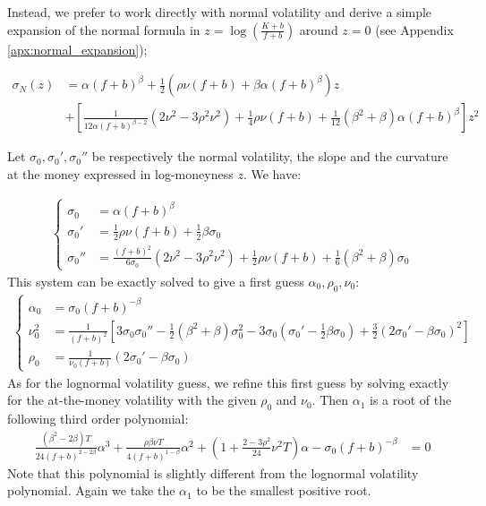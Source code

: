 \documentclass[]{rAMF2e}
\begin{document}
Instead, we prefer to work directly with normal volatility and derive a simple expansion of the normal formula in $z=\log\left(\frac{K+b}{f+b}\right)$ around $z=0$ (see Appendix \ref{apx:normal_expansion});

\begin{align}
\sigma_N(z) &= \alpha (f+b)^\beta + \frac{1}{2}\left(\rho \nu (f+b)+\beta \alpha (f+b)^\beta \right)z\nonumber\\
&+ \left[\frac{1}{12\alpha (f+b)^{\beta-2}}(2\nu^2-3\rho^2 \nu^2)+\frac{1}{4} \rho \nu (f+b)+\frac{1}{12}(\beta^2+\beta)\alpha (f+b)^\beta \right]z^2
\end{align}

Let $\sigma_0, \sigma_0', \sigma_0''$ be respectively the normal volatility, the slope and the curvature at the money expressed in log-moneyness $z$. We have:

\begin{align}
\begin{cases}
\sigma_0 &= \alpha (f+b)^{\beta}\\
\sigma_0' &= \frac{1}{2}\rho \nu (f+b) + \frac{1}{2} \beta \sigma_0\\
\sigma_0'' &= \frac{(f+b)^2}{6\sigma_0}(2\nu^2 - 3\rho^2\nu^2)+\frac{1}{2} \rho \nu (f+b)+\frac{1}{6}(\beta^2+\beta)\sigma_0
\end{cases}
\end{align}
This system can be exactly solved to give a first guess $\alpha_0, \rho_0,\nu_0$:
\begin{align}
  \begin{cases}
\alpha_0 &=  \sigma_0 (f+b)^{-\beta}\\
\nu_0^2 &= \frac{1}{(f+b)^2}\left[ 3\sigma_0\sigma_0''-\frac{1}{2}(\beta^2+\beta)\sigma_0^2-3\sigma_0(\sigma_0'-\frac{1}{2}\beta\sigma_0) +\frac{3}{2}\left(2\sigma_0'-\beta\sigma_0\right)^2\right] \\
\rho_0 &= \frac{1}{\nu_0 (f+b)}\left(2\sigma_0'-\beta\sigma_0\right) 
\end{cases} 
\end{align}
As for the lognormal volatility guess, we refine this first guess by solving exactly for the at-the-money volatility with the given 
$\rho_0$ and $\nu_0$. Then $\alpha_1$ is a root of the following third order polynomial:
\begin{align}
\frac{(\beta^2-2\beta) T}{24 (f+b)^{2-2\beta}}\alpha^3+ \frac{\rho\beta\nu T}{4(f+b)^{1-\beta}}\alpha^2 + \left(1+\frac{2-3\rho^2}{24}\nu^2 T\right)\alpha - \sigma_0 (f+b)^{-\beta} &= 0
\end{align}
Note that this polynomial is slightly different from the lognormal volatility polynomial. Again we take the $\alpha_1$ to be the smallest positive root.
 
\end{document}
